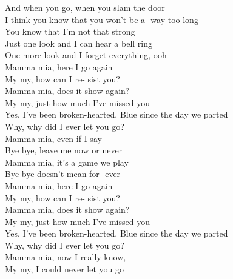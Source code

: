  And when you go,  when you slam the door\\
 I think you know  that you won't be a-  way too long\\
You know that I'm  not that strong\\
 Just  one  look and I can hear a bell ring\\
 One  more  look and I forget everything, ooh\\
 Mamma mia, here I go again\\
 My  my, how can I re-  sist you?\\
 Mamma mia, does it show again?\\
 My  my, just how much I've  missed you\\
Yes, I've been  broken-hearted,   Blue since the  day we parted\\
 Why,  why  did I ever  let you go?\\
 Mamma mia,  even if I say\\
 Bye  bye,  leave me now or  never\\
 Mamma mia,  it's a game we play\\
 Bye  bye  doesn't mean for-  ever\\
 Mamma mia, here I go again\\
 My  my, how can I re-  sist you?\\
 Mamma mia, does it show again?\\
 My  my, just how much I've  missed you\\
Yes, I've been  broken-hearted,   Blue since the  day we parted\\
 Why,  why  did I ever  let you go?\\
 Mamma mia,  now I really know,\\
 My  my,  I could never  let you go     
